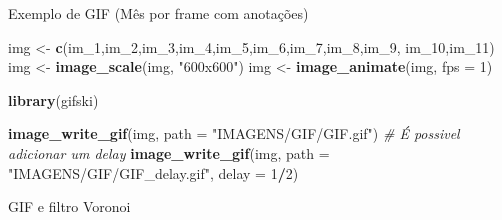 \documentclass[
  ignorenonframetext,
]{beamer}
\newenvironment{Shaded}{\begin{snugshade}}{\end{snugshade}}
\newcommand{\CommentTok}[1]{\textcolor[rgb]{0.56,0.35,0.01}{\textit{#1}}}
\newcommand{\DataTypeTok}[1]{\textcolor[rgb]{0.13,0.29,0.53}{#1}}
\newcommand{\DecValTok}[1]{\textcolor[rgb]{0.00,0.00,0.81}{#1}}
\newcommand{\KeywordTok}[1]{\textcolor[rgb]{0.13,0.29,0.53}{\textbf{#1}}}
\newcommand{\NormalTok}[1]{#1}
\newcommand{\OperatorTok}[1]{\textcolor[rgb]{0.81,0.36,0.00}{\textbf{#1}}}
\newcommand{\StringTok}[1]{\textcolor[rgb]{0.31,0.60,0.02}{#1}}
\begin{document}
\begin{frame}[fragile]{Exemplo de GIF (Mês por frame com anotações)}
\protect\hypertarget{exemplo-de-gif-muxeas-por-frame-com-anotauxe7uxf5es-1}{}

\begin{Shaded}
\begin{Highlighting}[]
\NormalTok{img <-}\StringTok{ }\KeywordTok{c}\NormalTok{(im_}\DecValTok{1}\NormalTok{,im_}\DecValTok{2}\NormalTok{,im_}\DecValTok{3}\NormalTok{,im_}\DecValTok{4}\NormalTok{,im_}\DecValTok{5}\NormalTok{,im_}\DecValTok{6}\NormalTok{,im_}\DecValTok{7}\NormalTok{,im_}\DecValTok{8}\NormalTok{,im_}\DecValTok{9}\NormalTok{,}
\NormalTok{         im_}\DecValTok{10}\NormalTok{,im_}\DecValTok{11}\NormalTok{)}
\NormalTok{img <-}\StringTok{ }\KeywordTok{image_scale}\NormalTok{(img, }\StringTok{"600x600"}\NormalTok{)}
\NormalTok{img <-}\StringTok{ }\KeywordTok{image_animate}\NormalTok{(img, }\DataTypeTok{fps =} \DecValTok{1}\NormalTok{)}
\end{Highlighting}
\end{Shaded}

\begin{Shaded}
\begin{Highlighting}[]
\KeywordTok{library}\NormalTok{(gifski)}

\KeywordTok{image_write_gif}\NormalTok{(img, }\DataTypeTok{path =} \StringTok{"IMAGENS/GIF/GIF.gif"}\NormalTok{)}
 \CommentTok{# É possivel adicionar um delay}
\KeywordTok{image_write_gif}\NormalTok{(img, }\DataTypeTok{path =} \StringTok{"IMAGENS/GIF/GIF_delay.gif"}\NormalTok{,}
                \DataTypeTok{delay =} \DecValTok{1}\OperatorTok{/}\DecValTok{2}\NormalTok{)}
\end{Highlighting}
\end{Shaded}

\end{frame}

\begin{frame}[fragile]{GIF e filtro Voronoi}
\protect\hypertarget{gif-e-filtro-voronoi}{}

\small

\begin{Shaded}
\end{Shaded}

\end{frame}
\end{document}
